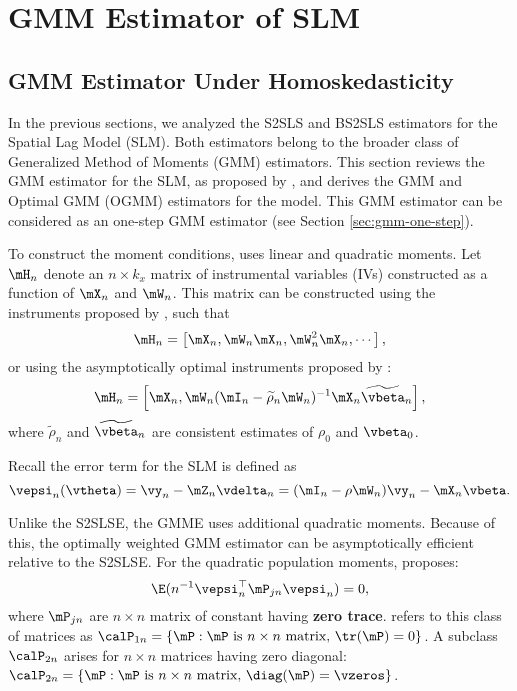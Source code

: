 \section{GMM Estimator of SLM}\label{sec:gmm-slm}

\subsection{GMM Estimator Under Homoskedasticity}\label{sec:gmm-slm-homo}

In the previous sections, we analyzed the S2SLS and BS2SLS estimators for the Spatial Lag Model (SLM). Both estimators belong to the broader class of Generalized Method of Moments (GMM) estimators. This section reviews the GMM estimator for the SLM, as proposed by \cite{lee2007gmm}, and derives the GMM and Optimal GMM (OGMM) estimators for the model. This GMM estimator can be considered as an one-step GMM estimator (see Section \ref{sec:gmm-one-step}).

To construct the moment conditions, \cite{lee2007gmm} uses linear and quadratic moments. Let $\mH_n$ denote an $n \times k_x$ matrix of instrumental variables (IVs) constructed as a function of $\mX_n$ and $\mW_n$. This matrix can be constructed using the instruments proposed by \cite{kelejian1998generalized}, such that
\begin{equation*}
\mH_n = \left[\mX_n, \mW_n\mX_n, \mW_n^2\mX_n, \cdots\right],
\end{equation*}
%
or using the asymptotically optimal instruments proposed by \cite{lee2003best}:
\begin{equation*}
\mH_n = \left[\mX_n,  \mW_n(\mI_n - \widetilde{\rho}_n\mW_n)^{-1}\mX_n\widetilde{\vbeta}_n\right],
\end{equation*}
%
where $\widetilde{\rho}_n$ and $\widetilde{\vbeta}_n$ are consistent estimates of $\rho_0$ and $\vbeta_0$.

Recall the error term for the SLM is defined as
\begin{equation*}
\vepsi_n(\vtheta) = \vy_n - \mZ_n\vdelta_n = (\mI_n - \rho \mW_n)\vy_n - \mX_n\vbeta.
\end{equation*}

Unlike the S2SLSE, the GMME uses additional quadratic moments. Because of this, the optimally weighted GMM estimator can be asymptotically efficient relative to the S2SLSE. For the quadratic population moments, \cite{lee2007gmm} proposes:
\begin{equation}\label{eq:quadractic-moment-lee}
\E(n^{-1}\vepsi_n^\top \mP_{jn}\vepsi_n) = 0, 
\end{equation}
%
where $\mP_{jn}$ are $n\times n$ matrix of constant having \textbf{zero trace}. \cite{lee2007gmm} refers to this class of matrices as $\calP_{1n} = \{\mP: \text{$\mP$ is $n\times n$ matrix, $\tr(\mP) = 0$}\}$. A subclass $\calP_{2n}$ arises for $n\times n$ matrices having zero diagonal: $\calP_{2n} = \{\mP: \text{$\mP$ is $n\times n$ matrix, $\diag(\mP) = \vzeros$}\}$. 

